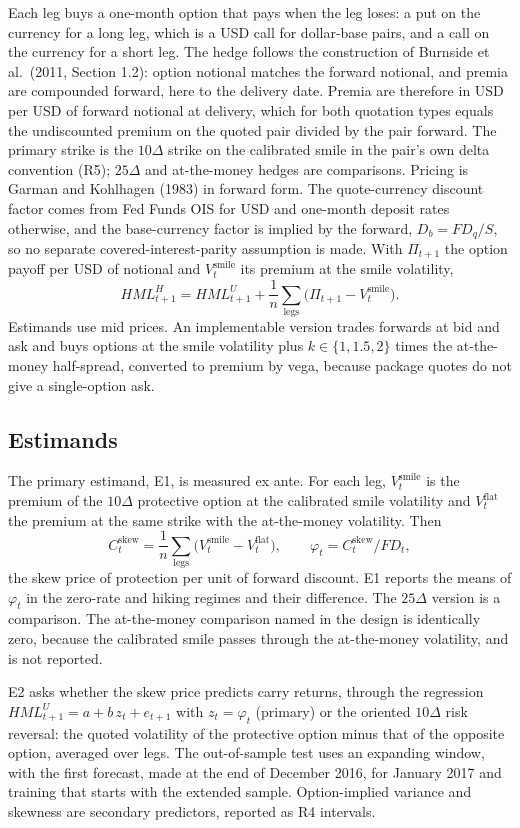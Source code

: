 \documentclass[11pt]{article}
\theoremstyle{result}
\newcommand{\HML}{\mathit{HML}}
\newcommand{\FD}{\mathit{FD}}
\newcommand{\Cskew}{C^{\mathrm{skew}}}
\newcommand{\Vsmile}{V^{\mathrm{smile}}}
\newcommand{\Vflat}{V^{\mathrm{flat}}}
\newcommand{\D}{\Delta}
\begin{document}
Each leg buys a one-month option that pays when the leg loses: a put on the currency for a long leg, which is a USD call for dollar-base pairs, and a call on the currency for a short leg. The hedge follows the construction of Burnside et al.\ (2011, Section 1.2): option notional matches the forward notional, and premia are compounded forward, here to the delivery date. Premia are therefore in USD per USD of forward notional at delivery, which for both quotation types equals the undiscounted premium on the quoted pair divided by the pair forward. The primary strike is the $10\D$ strike on the calibrated smile in the pair's own delta convention (R5); $25\D$ and at-the-money hedges are comparisons. Pricing is Garman and Kohlhagen (1983) in forward form. The quote-currency discount factor comes from Fed Funds OIS for USD and one-month deposit rates otherwise, and the base-currency factor is implied by the forward, $D_b=FD_q/S$, so no separate covered-interest-parity assumption is made. With $\Pi_{t+1}$ the option payoff per USD of notional and $\Vsmile_t$ its premium at the smile volatility,
\[
\HML^H_{t+1}=\HML^U_{t+1}+\frac1n\sum_{\text{legs}}\bigl(\Pi_{t+1}-\Vsmile_t\bigr).
\]
Estimands use mid prices. An implementable version trades forwards at bid and ask and buys options at the smile volatility plus $k\in\{1,1.5,2\}$ times the at-the-money half-spread, converted to premium by vega, because package quotes do not give a single-option ask.

\subsection{Estimands}

The primary estimand, E1, is measured ex ante. For each leg, $\Vsmile_t$ is the premium of the $10\D$ protective option at the calibrated smile volatility and $\Vflat_t$ the premium at the same strike with the at-the-money volatility. Then
\[
\Cskew_t=\frac1n\sum_{\text{legs}}\bigl(\Vsmile_t-\Vflat_t\bigr),\qquad \varphi_t=\Cskew_t/\FD_t,
\]
the skew price of protection per unit of forward discount. E1 reports the means of $\varphi_t$ in the zero-rate and hiking regimes and their difference. The $25\D$ version is a comparison. The at-the-money comparison named in the design is identically zero, because the calibrated smile passes through the at-the-money volatility, and is not reported.

E2 asks whether the skew price predicts carry returns, through the regression $\HML^U_{t+1}=a+b\,z_t+e_{t+1}$ with $z_t=\varphi_t$ (primary) or the oriented $10\D$ risk reversal: the quoted volatility of the protective option minus that of the opposite option, averaged over legs. The out-of-sample test uses an expanding window, with the first forecast, made at the end of December 2016, for January 2017 and training that starts with the extended sample. Option-implied variance and skewness are secondary predictors, reported as R4 intervals.
\end{document}
